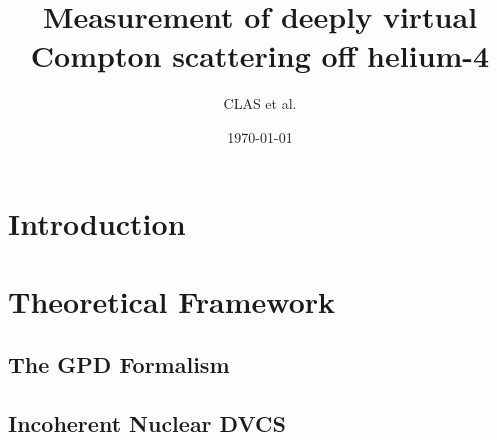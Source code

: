 \documentclass[aps,prc,preprint,superscriptaddress]{revtex4}
\begin{document}
\title{Measurement of deeply virtual Compton scattering off helium-4}


\author{CLAS et al.}

\noaffiliation

\date{\today}

\begin{abstract}
\end{abstract}

\pacs{}

\maketitle

\section{Introduction}

\section{Theoretical Framework}

  \subsection{The GPD Formalism}

  \subsection{Incoherent Nuclear DVCS}
\end{document}
